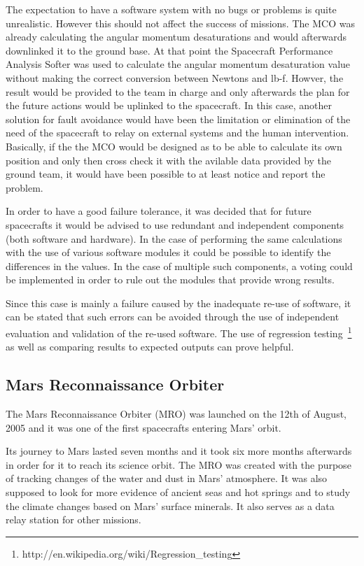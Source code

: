 The expectation to have a software system with no bugs or problems is quite
unrealistic. However this should not affect the success of missions. The MCO was
already calculating the angular momentum desaturations and would afterwards
downlinked it to the ground base. At that point the Spacecraft Performance
Analysis Softer was used to calculate the angular momentum desaturation value
without making the correct conversion between Newtons and lb-f. Howver, the
result would be provided to the team in charge and only afterwards the plan for
the future actions would be uplinked to the spacecraft. In this case, another
solution for fault avoidance would have been the limitation or elimination of
the need of the spacecraft to relay on external systems and the human
intervention. Basically, if the the MCO would be designed as to be able to
calculate its own position and only then cross check it with the avilable data
provided by the ground team, it would have been possible to at least notice and
report the problem.

In order to have a good failure tolerance, it was decided that for future
spacecrafts it would be advised to use redundant and independent components
(both software and hardware). In the case of performing the same calculations
with the use of various software modules it could be possible to identify the
differences in the values. In the case of multiple such components, a voting
could be implemented in order to rule out the modules that provide wrong
results.

Since this case is mainly a failure caused by the inadequate re-use of
software, it can be stated that such errors can be avoided through the use of
independent evaluation and validation of the re-used software. The use of
regression testing~\footnote{http://en.wikipedia.org/wiki/Regression\_testing}
as well as comparing results to expected outputs can prove helpful.
\subsection{Mars Reconnaissance Orbiter}

The Mars Reconnaissance Orbiter (MRO)\cite{mro-nasa} was launched on the 12th of
August, 2005 and it was one of the first spacecrafts entering Mars' orbit.

Its journey to Mars lasted seven months and it took six more months afterwards
in order for it to reach its science orbit. The MRO was created with the purpose
of tracking changes of the water and dust in Mars' atmosphere. It was also
supposed to look for more evidence of ancient seas and hot springs and to study
the climate changes based on Mars' surface minerals. It also serves as a data
relay station for other missions.

